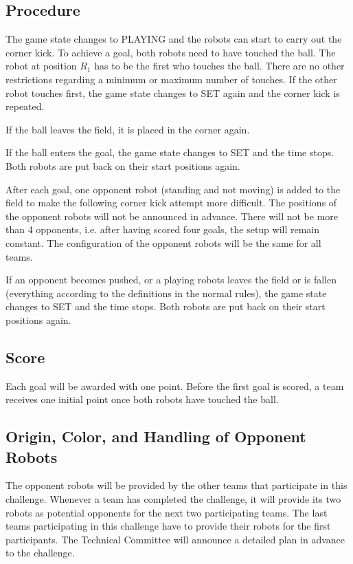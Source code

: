 \documentclass[12pt]{article}
\begin{document}
\subsection{Procedure}
The game state changes to PLAYING and the robots can start to carry out the corner kick. To achieve a goal, both robots need to have touched the ball. The robot at position $R_1$ has to be the first who touches the ball. There are no other restrictions regarding a minimum or maximum number of touches. If the other robot touches first, the game state changes to SET again and the corner kick is repeated.

If the ball leaves the field, it is placed in the corner again.

If the ball enters the goal, the game state changes to SET and the time stops. Both robots are put back on their start positions again.

After each goal, one opponent robot (standing and not moving) is added to the field to make the following corner kick attempt more difficult. The positions of the opponent robots will not be announced in advance. There will not be more than 4 opponents, i.e. after having scored four goals, the setup will remain constant. The configuration of the opponent robots will be the same for all teams. 

If an opponent becomes pushed, or a playing robots leaves the field or is fallen (everything according to the definitions in the normal rules), the game state changes to SET and the time stops. Both robots are put back on their start positions again.

\subsection{Score}
Each goal will be awarded with one point.
Before the first goal is scored, a team receives one initial point once both robots have touched the ball.

\subsection{Origin, Color, and Handling of Opponent Robots}
The opponent robots will be provided by the other teams that participate in this challenge. Whenever a team has completed the challenge, it will provide its two robots as potential opponents for the next two participating teams. The last teams participating in this challenge have to provide their robots for the first participants. The Technical Committee will announce a detailed plan in advance to the challenge.
\end{document}
